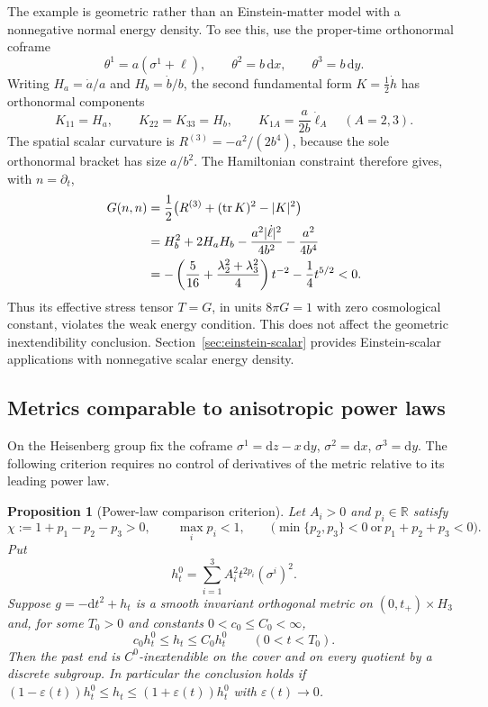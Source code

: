 \documentclass[10pt,a4paper]{article}
\numberwithin{equation}{section}
\newtheorem{proposition}[theorem]{Proposition}
\theoremstyle{definition}
\theoremstyle{remark}
\newcommand{\R}{\mathbb R}
\newcommand{\dd}{\mathrm d}
\newcommand{\eps}{\varepsilon}
\begin{document}
The example is geometric rather than an Einstein-matter model with a
nonnegative normal energy density.  To see this, use the proper-time
orthonormal coframe
\[
 \theta^1=a(\sigma^1+\ell),\qquad
 \theta^2=b\,\dd x,\qquad \theta^3=b\,\dd y.
\]
Writing $H_a=\dot a/a$ and $H_b=\dot b/b$, the second fundamental form
$K=\tfrac12\dot h$ has orthonormal components
\[
 K_{11}=H_a,\qquad K_{22}=K_{33}=H_b,\qquad
 K_{1A}=\frac{a}{2b}\dot\ell_A\quad(A=2,3).
\]
The spatial scalar curvature is $R^{(3)}=-a^2/(2b^4)$, because the
sole orthonormal bracket has size $a/b^2$.  The Hamiltonian constraint
therefore gives, with $n=\partial_t$,
\begin{align}
 G(n,n)
 &=\frac12\bigl(R^{(3)}+(\operatorname{tr}K)^2-|K|^2\bigr)\notag\\
 &=H_b^2+2H_aH_b-\frac{a^2|\dot\ell|^2}{4b^2}
                  -\frac{a^2}{4b^4}\notag\\
 &=-\left(\frac5{16}+\frac{\lambda_2^2+\lambda_3^2}{4}\right)t^{-2}
   -\frac14t^{5/2}<0.
 \label{eq:coupling-example-negative-energy}
\end{align}
Thus its effective stress tensor $T=G$, in units $8\pi G=1$ with zero
cosmological constant, violates the weak energy condition.  This does
not affect the geometric inextendibility conclusion.  Section~\ref{sec:einstein-scalar} provides Einstein-scalar applications with nonnegative scalar energy density.

\subsection{Metrics comparable to anisotropic power laws}

On the Heisenberg group fix the coframe
$\sigma^1=\dd z-x\,\dd y$, $\sigma^2=\dd x$, $\sigma^3=\dd y$.
The following criterion requires no control of derivatives of the metric
relative to its leading power law.

\begin{proposition}[Power-law comparison criterion]
\label{prop:asymptotic-transfer}
Let $A_i>0$ and $p_i\in\R$ satisfy
\begin{equation}
 \chi:=1+p_1-p_2-p_3>0,\qquad
 \max_i p_i<1,\qquad
 \bigl(\min\{p_2,p_3\}<0\ \text{or}\ p_1+p_2+p_3<0\bigr).
 \label{eq:transfer-exponents}
\end{equation}
Put
\[
 h_t^0=\sum_{i=1}^3 A_i^2t^{2p_i}(\sigma^i)^2.
\]
Suppose $g=-\dd t^2+h_t$ is a smooth invariant orthogonal metric on
$(0,t_+)\times H_3$ and, for some $T_0>0$ and constants
$0<c_0\le C_0<\infty$,
\begin{equation}
 c_0h_t^0\le h_t\le C_0h_t^0\qquad(0<t<T_0).
 \label{eq:asymptotic-comparison}
\end{equation}
Then the past end is $C^0$-inextendible on the cover and on every quotient
by a discrete subgroup.  In particular the conclusion holds if
$(1-\eps(t))h_t^0\le h_t\le(1+\eps(t))h_t^0$ with $\eps(t)\to0$.
\end{proposition}
\end{document}
